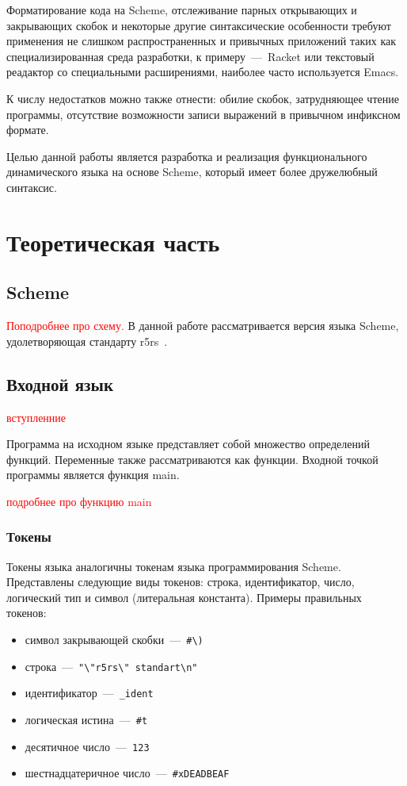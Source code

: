 \documentclass[12pt,a4paper,oneside]{extarticle}
\begin{document}
    Форматирование кода на Scheme, отслеживание парных открывающих и закрывающих скобок и некоторые другие синтаксические особенности требуют применения не слишком распространенных и привычных приложений таких как специализированная среда разработки, к примеру~---~Racket или текстовый реадактор со специальными расширениями, наиболее часто используется Emacs. 

    К числу недостатков можно также отнести: обилие скобок, затрудняющее чтение программы, отсутствие возможности записи выражений в привычном инфиксном формате.
    
    Целью данной работы является разработка и реализация функционального динамического языка на основе Scheme, который имеет более дружелюбный синтаксис.
\clearpage

\section{Теоретическая часть}
    \subsection{Scheme}
        \textcolor{red}{Поподробнее про схему.}
        В данной работе рассматривается версия языка Scheme, удолетворяющая стандарту r5rs~\cite{r5rs}.
    \subsection{Входной язык}
        \textcolor{red}{вступленние}

        Программа на исходном языке представляет собой множество определений функций.
        Переменные также рассматриваются как функции.
        Входной точкой программы является функция main.

        \textcolor{red}{подробнее про функцию main}

        \subsubsection{Токены}
            Токены языка аналогичны токенам языка программирования Scheme.
            Представлены следующие виды токенов: строка, идентификатор, число, логический тип и символ (литеральная константа). Примеры правильных токенов: 

            \begin{itemize}
                \item символ закрывающей скобки~---~\lstinline$#\)$
                \item строка~---~\lstinline$"\"r5rs\" standart\n"$
                \item идентификатор~---~\lstinline$_ident$
                \item логическая истина~---~\lstinline$#t$
                \item десятичное число~---~\lstinline$123$
                \item шестнадцатеричное число~---~\lstinline$#xDEADBEAF$
            \end{itemize}
\end{document}

